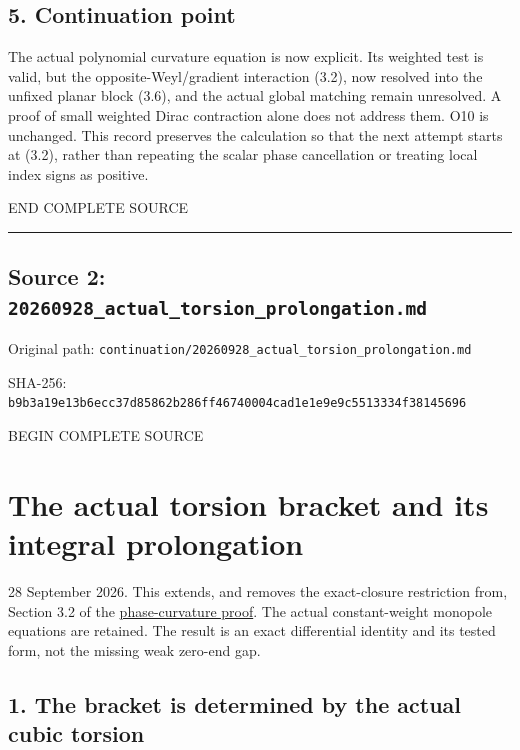 \documentclass[
  10pt,
]{article}
\begin{document}
\hypertarget{continuation-point}{%
\subsection{5. Continuation point}\label{continuation-point}}

The actual polynomial curvature equation is now explicit. Its weighted
test is valid, but the opposite-Weyl/gradient interaction (3.2), now
resolved into the unfixed planar block (3.6), and the actual global
matching remain unresolved. A proof of small weighted Dirac contraction
alone does not address them. O10 is unchanged. This record preserves the
calculation so that the next attempt starts at (3.2), rather than
repeating the scalar phase cancellation or treating local index signs as
positive.

END COMPLETE SOURCE

\begin{center}\rule{0.5\linewidth}{0.5pt}\end{center}

\hypertarget{source-2-20260928_actual_torsion_prolongation.md}{%
\subsection{Source 2:
\nolinkurl{20260928_actual_torsion_prolongation.md}}\label{source-2-20260928_actual_torsion_prolongation.md}}

Original path:
\nolinkurl{continuation/20260928_actual_torsion_prolongation.md}

SHA-256:
\nolinkurl{b9b3a19e13b6ecc37d85862b286ff46740004cad1e1e9e9c5513334f38145696}

BEGIN COMPLETE SOURCE

\hypertarget{the-actual-torsion-bracket-and-its-integral-prolongation}{%
\section{The actual torsion bracket and its integral
prolongation}\label{the-actual-torsion-bracket-and-its-integral-prolongation}}

28 September 2026. This extends, and removes the exact-closure
restriction from, Section 3.2 of the
\href{20260928_zero_endpoint_phase_curvature.md}{phase-curvature proof}.
The actual constant-weight monopole equations are retained. The result
is an exact differential identity and its tested form, not the missing
weak zero-end gap.

\hypertarget{the-bracket-is-determined-by-the-actual-cubic-torsion}{%
\subsection{1. The bracket is determined by the actual cubic
torsion}\label{the-bracket-is-determined-by-the-actual-cubic-torsion}}
\end{document}
